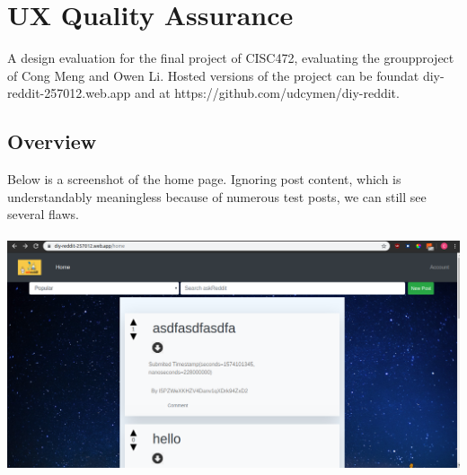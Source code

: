 %
%
\chapter{UX Quality Assurance}
A design evaluation for the final project of CISC472, evaluating the groupproject of Cong Meng and Owen Li. Hosted versions of the project can be foundat diy-reddit-257012.web.app and at https://github.com/udcymen/diy-reddit.

\section{Overview}

Below is a screenshot of the home page. Ignoring post content, which is understandably meaningless because of numerous test posts, we can still see several flaws.
\\\\
\includegraphics[width = 400pt]{images/home.png}

